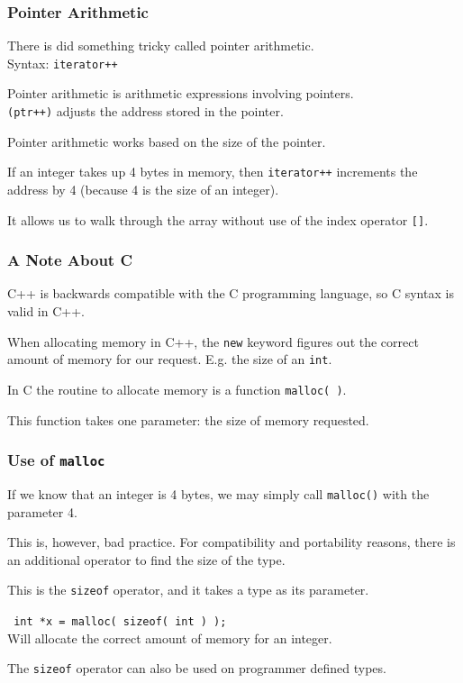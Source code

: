 \begin{frame}
\frametitle{Pointer Arithmetic}

There is did something tricky called \alert{pointer arithmetic}.\\
\quad Syntax: \texttt{iterator++}

Pointer arithmetic is arithmetic expressions involving pointers.\\
\quad \texttt{(ptr++)} adjusts the address stored in the pointer.

Pointer arithmetic works based on the size of the pointer.

If an integer takes up 4 bytes in memory, then \texttt{iterator++} increments the address by 4 (because 4 is the size of an integer).

It allows us to walk through the array without use of the index operator \texttt{[]}.

\end{frame}



\begin{frame}
\frametitle{A Note About C}

C++ is backwards compatible with the C programming language, so C syntax is valid in C++.

When allocating memory in C++, the \texttt{new} keyword figures out the correct amount of memory for our request. E.g. the size of an \texttt{int}.

In C the routine to allocate memory is a function \texttt{malloc( )}.

This function takes one parameter: the size of memory requested.

\end{frame}



\begin{frame}
\frametitle{Use of \texttt{malloc}}

If we know that an integer is 4 bytes, we may simply call \texttt{malloc()} with the parameter 4.

This is, however, bad practice. For compatibility and portability reasons, there is an additional operator to find the size of the type.

This is the \texttt{sizeof} operator, and it takes a type as its parameter.

\texttt{ int *x = malloc( sizeof( int ) );}\\
\quad Will allocate the correct amount of memory for an integer.

The \texttt{sizeof} operator can also be used on programmer defined types.

\end{frame}



